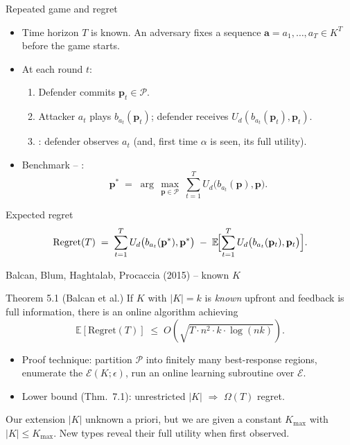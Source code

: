 \documentclass[10pt,aspectratio=169]{beamer}
\newcommand{\impterm}[1]{\textbf{\color{blueprimary}{#1}}}
\newcommand{\impcompterm}[1]{\textbf{\color{darkgreen}{#1}}}
\newcommand{\argmax}{\arg\,\max}
\newcommand{\pvec}{\mathbf{p}}
\newcommand{\avec}{\mathbf{a}}
\newcommand{\cP}{\mathcal{P}}
\newcommand{\cE}{\mathcal{E}}
\newcommand{\Kmax}{K_{\max}}
\newcommand{\EE}{\mathbb{E}}
\newenvironment{greenblock}[1]{\begin{exampleblock}{#1}}{\end{exampleblock}}
\begin{document}
\begin{frame}{Repeated game and regret}
\begin{itemize}
  \item Time horizon $T$ is known. An \impterm{oblivious} adversary fixes a sequence $\avec=a_1,\dots,a_T\in K^T$ before the game starts.
  \item At each round $t$:
    \begin{enumerate}\small
      \item Defender commits $\pvec_t\in\cP$.
      \item Attacker $a_t$ plays $b_{a_t}(\pvec_t)$; defender receives $U_d(b_{a_t}(\pvec_t),\pvec_t)$.
      \item \impcompterm{Full information feedback}: defender observes $a_t$ (and, first time $\alpha$ is seen, its full utility).
    \end{enumerate}
  \item Benchmark -- \impterm{best fixed coverage in hindsight}:
        \[ \pvec^{*}\;=\;\argmax_{\pvec\in\cP}\;\sum_{t=1}^T U_d\bigl(b_{a_t}(\pvec),\pvec\bigr).\]
\end{itemize}
\pause
\vspace{-4pt}
\begin{greenblock}{Expected regret}
\[
\mathrm{Regret}(T)\;=\;\sum_{t=1}^{T}U_d\bigl(b_{a_t}(\pvec^{*}),\pvec^{*}\bigr)\;-\;\EE\!\Bigl[\sum_{t=1}^{T}U_d\bigl(b_{a_t}(\pvec_t),\pvec_t\bigr)\Bigr].
\]
\end{greenblock}
\end{frame}


\begin{frame}{Balcan, Blum, Haghtalab, Procaccia (2015) -- known $K$}
\begin{greenblock}{Theorem 5.1 (Balcan et al.)}
If $K$ with $|K|=k$ is \emph{known} upfront and feedback is full information, there is an online algorithm achieving
\[
\EE[\mathrm{Regret}(T)]\;\le\;O\!\left(\sqrt{T\cdot n^2\cdot k\cdot\log(nk)}\right).
\]
\end{greenblock}
\pause
\begin{itemize}
  \item Proof technique: partition $\cP$ into finitely many best-response regions, enumerate the \impcompterm{$\epsilon$-approximate extreme point set} $\cE(K;\epsilon)$, run an online learning subroutine over $\cE$.
  \item Lower bound (Thm.\ 7.1): unrestricted $|K|$ $\Rightarrow$ $\Omega(T)$ regret.
\end{itemize}
\pause
\vspace{3pt}
\begin{alertblock}{Our extension}
$|K|$ unknown a priori, but we are given a constant $\Kmax$ with $|K|\le\Kmax$.
New types reveal their full utility when first observed.
\end{alertblock}
\end{frame}
\end{document}
